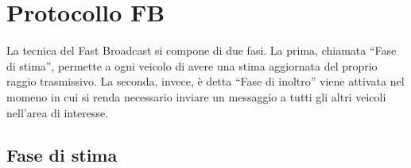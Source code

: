 
\chapter{Protocollo FB}
La tecnica del Fast Broadcast \cite{Palazzi07howdo} si compone di due fasi. La prima, chiamata ``Fase di stima'', permette a ogni veicolo di avere una stima aggiornata
del proprio raggio trasmissivo. La seconda, invece, è detta ``Fase di inoltro'' viene attivata nel momeno in cui si renda necessario inviare un messaggio
a tutti gli altri veicoli nell'area di interesse.

\section{Fase di stima}
